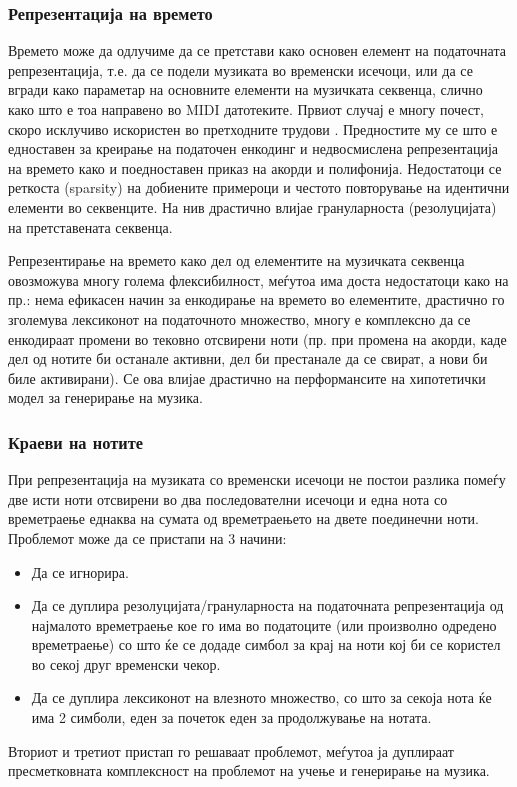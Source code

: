 \subsubsection{Репрезентација на времето}

Времето може да одлучиме да се претстави како основен елемент на податочната репрезентација, т.е. да се подели музиката во временски исечоци, или да се вгради како параметар на основните елементи на музичката секвенца, слично како што е тоа направено во MIDI датотеките. Првиот случај е многу почест, скоро исклучиво искористен во претходните трудови \cite{Hadjeres2016,Boulanger-Lewandowski2012,Boulanger-Lewandowski2014,Eck2002,Eck2008,Walder2016,Dong2017,Dong2018}. Предностите му се што е едноставен за креирање на податочен енкодинг и недвосмислена репрезентација на времето како и поедноставен приказ на акорди и полифонија. Недостатоци се реткоста (sparsity) на добиените примероци и честото повторување на идентични елементи во секвенците. На нив драстично влијае грануларноста (резолуцијата) на претставената секвенца. 

Репрезентирање на времето како дел од елементите на музичката секвенца овозможува многу голема флексибилност, меѓутоа има доста недостатоци како на пр.: нема ефикасен начин за енкодирање на времето во елементите, драстично го зголемува лексиконот на податочното множество, многу е комплексно да се енкодираат промени во тековно отсвирени ноти (пр. при промена на акорди, каде дел од нотите би останале активни, дел би престанале да се свират, а нови би биле активирани). Се ова влијае драстично на перформансите на хипотетички модел за генерирање на музика.

\subsubsection{Краеви на нотите}

При репрезентација на музиката со временски исечоци не постои разлика помеѓу две исти ноти отсвирени во два последователни исечоци и една нота со времетраење еднаква на сумата од времетраењето на двете поединечни ноти. Проблемот може да се пристапи на 3 начини:
\begin{itemize}
    \item Да се игнорира.
    \item Да се дуплира резолуцијата/грануларноста на податочната репрезентација од најмалото времетраење кое го има во податоците (или произволно одредено времетраење) со што ќе се додаде симбол за крај на ноти кој би се користел во секој друг временски чекор.
    \item Да се дуплира лексиконот на влезното множество, со што за секоја нота ќе има 2 симболи, еден за почеток еден за продолжување на нотата.
\end{itemize}
Вториот и третиот пристап го решаваат проблемот, меѓутоа ја дуплираат пресметковната комплексност на проблемот на учење и генерирање на музика.


